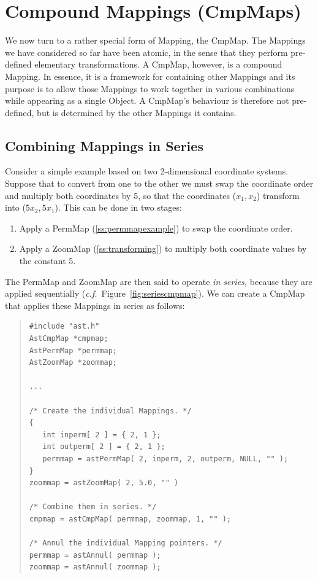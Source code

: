 \documentclass[twoside,11pt]{article}
\newcommand{\htmlref}[2]{#1}
\newcommand{\secref}[1]{\S\ref{#1}}
\renewcommand{\secref}[1]{\ref{#1}}
\begin{document}
\section{\label{ss:cmpmaps}Compound Mappings (CmpMaps)}

We now turn to a rather special form of \htmlref{Mapping}{Mapping}, the \htmlref{CmpMap}{CmpMap}. The
Mappings we have considered so far have been atomic, in the sense that
they perform pre-defined elementary transformations. A CmpMap,
however, is a compound Mapping. In essence, it is a framework for
containing other Mappings and its purpose is to allow those Mappings
to work together in various combinations while appearing as a single
\htmlref{Object}{Object}. A CmpMap's behaviour is therefore not pre-defined, but is
determined by the other Mappings it contains.

\subsection{\label{ss:seriescmpmap}Combining Mappings in Series}

Consider a simple example based on two 2-dimensional coordinate
systems. Suppose that to convert from one to the other we must swap
the coordinate order and multiply both coordinates by 5, so that the
coordinates ($x_1,x_2$) transform into ($5x_2,5x_1$). This can be done
in two stages:

\begin{enumerate}
\item Apply a \htmlref{PermMap}{PermMap} (\secref{ss:permmapexample}) to swap the
coordinate order.

\item Apply a \htmlref{ZoomMap}{ZoomMap} (\secref{ss:transforming}) to multiply both
coordinate values by the constant 5.
\end{enumerate}

The PermMap and ZoomMap are then said to operate {\em{in series,}}
because they are applied sequentially
({\em{c.f.}}\ Figure~\ref{fig:seriescmpmap}).  We can create a \htmlref{CmpMap}{CmpMap}
that applies these Mappings in series as follows:

\begin{quote}
\small
\begin{verbatim}
#include "ast.h"
AstCmpMap *cmpmap;
AstPermMap *permmap;
AstZoomMap *zoommap;

...

/* Create the individual Mappings. */
{
   int inperm[ 2 ] = { 2, 1 };
   int outperm[ 2 ] = { 2, 1 };
   permmap = astPermMap( 2, inperm, 2, outperm, NULL, "" );
}
zoommap = astZoomMap( 2, 5.0, "" )

/* Combine them in series. */
cmpmap = astCmpMap( permmap, zoommap, 1, "" );

/* Annul the individual Mapping pointers. */
permmap = astAnnul( permmap );
zoommap = astAnnul( zoommap );
\end{verbatim}
\normalsize
\end{quote}
\end{document}
